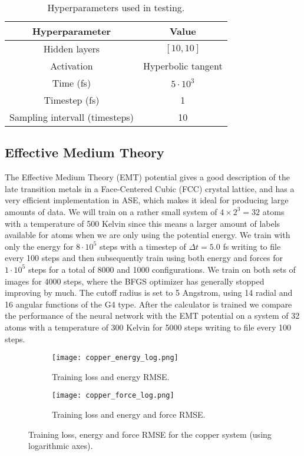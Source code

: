 \begin{table}[H]
\centering
\begin{tabular}{|c c|}
\hline
Hyperparameter & Value \\
\hline \hline
    Hidden layers & $\left[10, 10\right]$ \\
Activation & Hyperbolic tangent \\
    Time (fs) & $5 \cdot 10^3$ \\
    Timestep (fs) & 1 \\
    Sampling intervall (timesteps) & 10 \\
\hline
\end{tabular}
\caption{Hyperparameters used in testing.}
\label{tab:hyperparam-test}
\end{table}

\subsection{Effective Medium Theory}
The Effective Medium Theory (EMT) potential gives a good description
of the late transition metals in a Face-Centered Cubic (FCC) crystal
lattice, and has a very efficient implementation in ASE,
which makes it ideal for producing large amounts of data.
We will train on a rather small system of $4 \times 2^3 = 32$ atoms
with a temperature of 500 Kelvin since this means a larger amount of labels available
for atoms when we are only using the potential energy.
We train with only the energy for $8 \cdot 10^5$ steps
with a timestep of $\Delta t = 5.0$ fs
writing to file every 100 steps and then subsequently
train using both energy and forces for $1 \cdot 10^5$ steps
for a total of 8000 and 1000 configurations. 
We train on both sets of images
for 4000 steps, where the BFGS optimizer has generally stopped
improving by much.
The cutoff radius is set to 5 Angstrom, using 14 radial and
16 angular functions of the G4 type.
After the calculator is trained we compare the performance
of the neural network with the EMT potential on a system
of 32 atoms with a temperature of 300 Kelvin for 5000 steps
writing to file every 100 steps.

\begin{figure}[H]
\begin{adjustbox}{max width=1.2\linewidth,center}
\centering
  \begin{subfigure}[b]{0.55\textwidth}
      \texttt{[image: copper\_energy\_log.png]}
      \caption{Training loss and energy RMSE.}
  \end{subfigure}
  \hfill
  \begin{subfigure}[b]{0.55\textwidth}
      \texttt{[image: copper\_force\_log.png]}
      \caption{Training loss and energy and force RMSE.}
  \end{subfigure}
\end{adjustbox}
\caption{Training loss, energy and force RMSE for the copper
    system (using logarithmic axes).}
    \label{fig:copper-log}
\end{figure}

